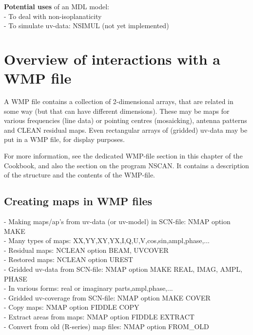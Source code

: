 {\bf Potential uses} of an MDL model:\\ 
- To deal with non-isoplanaticity\\ 
- To simulate uv-data: NSIMUL (not yet implemented)\\ 




\section{Overview
of interactions with a WMP file} 
\label{wmp.inter} 

	A WMP file contains a collection of 2-dimensional arrays, that are
related in some way (but that can have different dimensions).  These may be
maps for various frequencies (line data) or pointing centres 
(mosaicking), antenna patterns and CLEAN residual maps.  Even rectangular
arrays of (gridded) uv-data may be put in a WMP file, for display purposes. 

	For more information, see the dedicated WMP-file section in this
chapter of the Cookbook, and also the section on the program NSCAN.  It
contains a description of the structure and the contents of the 
WMP-file. 



\subsection{Creating maps in WMP files} 
\label{wmp.create} 

- Making maps/ap's from uv-data (or uv-model) in SCN-file: NMAP option MAKE\\ 
\hspace*{5mm} - Many types of maps: 
XX,YY,XY,YX,I,Q,U,V,cos,sin,ampl,phase,...\\ 
- Residual maps: NCLEAN option BEAM, UVCOVER\\ 
- Restored maps: NCLEAN option UREST\\ 
- Gridded uv-data from SCN-file: NMAP option MAKE REAL, IMAG, AMPL, PHASE\\ 
\hspace*{5mm} - In various forms: real or imaginary parts,ampl,phase,...\\ 
- Gridded uv-coverage from SCN-file: NMAP option MAKE COVER\\ 
- Copy maps: NMAP option FIDDLE COPY\\ 
- Extract areas from maps: NMAP option FIDDLE EXTRACT\\ 
- Convert from old (R-series) map files: NMAP option FROM\_OLD\\ 

